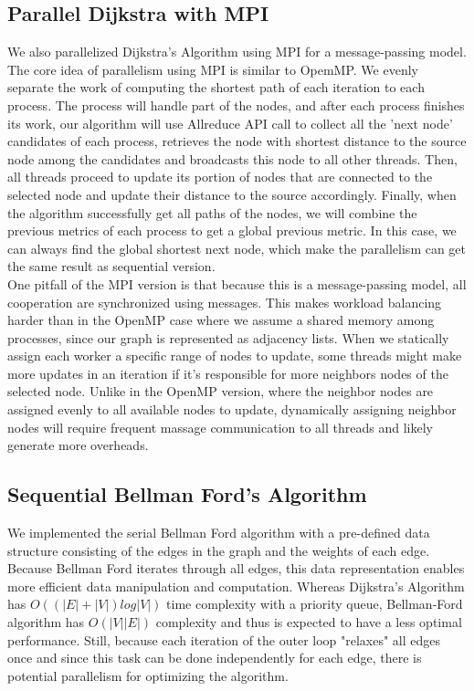 \documentclass[12pt]{article}
\begin{document}
\subsection{Parallel Dijkstra with MPI}
We also parallelized Dijkstra's Algorithm using MPI for a message-passing model. The core idea of parallelism using MPI is similar to OpemMP. We evenly separate the work of computing the shortest path of each iteration to each process. The process will handle part of the nodes, and after each process finishes its work, our algorithm will use Allreduce API call to collect all the 'next node' candidates of each process, retrieves the node with shortest distance to the source node among the candidates and broadcasts this node to all other threads. Then, all threads proceed to update its portion of nodes that are connected to the selected node and update their distance to the source accordingly. Finally, when the algorithm successfully get all paths of the nodes, we will combine the previous metrics of each process to get a global previous metric. In this case, we can always find the global shortest next node, which make the parallelism can get the same result as sequential version. \\
One pitfall of the MPI version is that because this is a message-passing model, all cooperation are synchronized using messages. This makes workload balancing harder than in the OpenMP case where we assume a shared memory among processes, since our graph is represented as adjacency lists. When we statically assign each worker a specific range of nodes to update, some threads might make more updates in an iteration if it's responsible for more neighbors nodes of the selected node. Unlike in the OpenMP version, where the neighbor nodes are assigned evenly to all available nodes to update, dynamically assigning neighbor nodes will require frequent massage communication to all threads and likely generate more overheads.

\subsection{Sequential Bellman Ford's Algorithm}
We implemented the serial Bellman Ford algorithm with a pre-defined data structure consisting of the edges in the graph and the weights of each edge. Because Bellman Ford iterates through all edges, this data representation enables more efficient data manipulation and computation. Whereas Dijkstra's Algorithm has $O((|E|+|V|)log|V|)$ time complexity with a priority queue, Bellman-Ford algorithm has $O(|V||E|)$ complexity and thus is expected to have a less optimal performance. Still, because each iteration of the outer loop "relaxes" all edges once and since this task can be done independently for each edge, there is potential parallelism for optimizing the algorithm.
\end{document}
